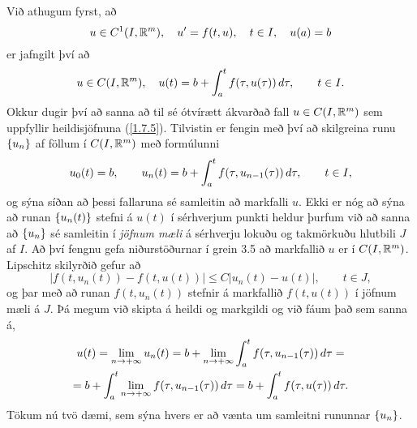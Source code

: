  Við athugum fyrst, að 
\begin{equation*}u\in C\sp 1(I,{\mathbb R}\sp m), \quad u{\sp{\prime}}=f(t,u),\quad t\in I, \quad
u(a)=b \label{1.7.4}
 \end{equation*}
er jafngilt því að
 \begin{equation*}
u\in C(I,{\mathbb R}\sp m),\quad 
u(t)=b+\int_a\sp t f(\tau,u(\tau))\, d\tau, \qquad t\in I.\label{1.7.5} 
 \end{equation*}
Okkur dugir því að sanna að til sé ótvírætt ákvarðað fall $u\in
C(I,{\mathbb R}\sp m)$ sem uppfyllir heildisjöfnuna (\ref{1.7.5}). 
Tilvistin er fengin með því að skilgreina runu ${\{ u_n\}}$ af föllum í
$C(I,{\mathbb R}\sp m)$ með formúlunni
 \begin{equation*}u_0(t)=b, \qquad 
u_n(t)=b+\int_a\sp t f(\tau,u_{n-1}(\tau))\, d\tau, \qquad t\in
I,\label{1.7.6} 
 \end{equation*}
og sýna síðan að þessi fallaruna sé samleitin að markfalli $u$.
Ekki er nóg að sýna að runan ${\{u_n(t)\}}$ stefni á $u(t)$  í sérhverjum
punkti heldur þurfum við að sanna að ${\{u_n\}}$ sé samleitin í
{\it jöfnum mæli} 
á sérhverju lokuðu og takmörkuðu hlutbili $J$ af
$I$.  Að því fengnu gefa niðurstöðurnar í grein 3.5 að 
markfallið $u$ er í $C(I,{\mathbb R}\sp m)$. 
Lipschitz skilyrðið gefur að 
 $$|f(t,u_n(t))-f(t,u(t))|\leq C|u_n(t)-u(t)|, \qquad t\in J,
 $$
og þar með að runan $f(t,u_n(t))$ stefnir á markfallið $f(t,u(t))$
í jöfnum mæli á $J$.  Þá  megum við skipta á heildi og markgildi og
við fáum það sem sanna á,
\begin{multline*}
u(t)= \lim\limits_{n\to +\infty} u_n(t) =
b+\lim\limits_{n\to +\infty} \int_a\sp t f(\tau,u_{n-1}(\tau)) \, d\tau =\\
=
b+\int_a\sp t \lim\limits_{n\to +\infty} f(\tau,u_{n-1}(\tau)) \, d\tau =
b+ \int_a\sp t f(\tau,u(\tau)) \, d\tau.
\end{multline*}
Tökum nú tvö dæmi, sem sýna hvers er að vænta um
samleitni rununnar ${\{u_n\}}$. 